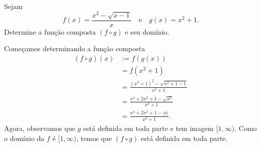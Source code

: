 \begin{exeresol}
  Sejam
  \begin{equation}
    f(x) = \frac{x^2 - \sqrt{x-1}}{x}\quad\text{e}\quad g(x) = x^2 + 1.
  \end{equation}
  Determine a função composta $(f\circ g)$ e seu domínio.
\end{exeresol}
\begin{resol}
  Começamos determinando a função composta
  \begin{align}
    (f\circ g)(x) &:= f(g(x))\\
                  &= f(x^2 + 1)\\
                  &= \frac{(x^2 + 1)^2 - \sqrt{x^2+1-1}}{x^2 + 1}\\
                  &= \frac{x^4 + 2x^2 + 1 - \sqrt{x^2}}{x^2 + 1}\\
                  &= \frac{x^4 + 2x^2 + 1 - |x|}{x^2 + 1}.
  \end{align}
  Agora, observamos que $g$ está definida em toda parte e tem imagem $[1, \infty)$. Como o domínio da $f$ é $[1, \infty)$, temos que $(f\circ g)$ está definida em toda parte.
\end{resol}

